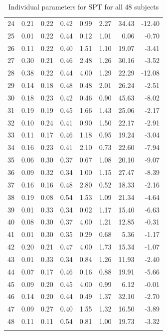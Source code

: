 \documentclass[11pt, a4paper, oneside,final,notitlepage,onecolumn]{article}\usepackage[]{graphicx}\usepackage[]{color}
\begin{document}
\begin{longtable}{rrrrrrrr}
  24 & 0.21 & 0.22 & 0.42 & 0.99 & 2.27 & 34.43 & -12.40 \\ 
  25 & 0.01 & 0.22 & 0.44 & 0.12 & 1.01 & 0.06 & -0.70 \\ 
  26 & 0.11 & 0.22 & 0.40 & 1.51 & 1.10 & 19.07 & -3.41 \\ 
  27 & 0.30 & 0.21 & 0.46 & 2.48 & 1.26 & 30.16 & -3.52 \\ 
  28 & 0.38 & 0.22 & 0.44 & 4.00 & 1.29 & 22.29 & -12.08 \\ 
  29 & 0.14 & 0.18 & 0.48 & 0.48 & 2.01 & 26.24 & -2.51 \\ 
  30 & 0.18 & 0.23 & 0.42 & 0.46 & 0.90 & 45.63 & -8.02 \\ 
  31 & 0.19 & 0.19 & 0.45 & 1.66 & 1.43 & 25.06 & -2.17 \\ 
  32 & 0.10 & 0.24 & 0.41 & 0.90 & 1.50 & 22.17 & -2.91 \\ 
  33 & 0.11 & 0.17 & 0.46 & 1.18 & 0.95 & 19.24 & -3.04 \\ 
  34 & 0.16 & 0.23 & 0.41 & 2.10 & 0.73 & 22.60 & -7.94 \\ 
  35 & 0.06 & 0.30 & 0.37 & 0.67 & 1.08 & 20.10 & -9.07 \\ 
  36 & 0.09 & 0.32 & 0.34 & 1.00 & 1.15 & 27.47 & -8.39 \\ 
  37 & 0.16 & 0.16 & 0.48 & 2.80 & 0.52 & 18.33 & -2.16 \\ 
  38 & 0.19 & 0.08 & 0.54 & 1.53 & 1.09 & 21.34 & -4.64 \\ 
  39 & 0.01 & 0.33 & 0.34 & 0.02 & 1.17 & 15.40 & -6.63 \\ 
  40 & 0.08 & 0.30 & 0.37 & 4.00 & 1.21 & 12.85 & -0.31 \\ 
  41 & 0.01 & 0.30 & 0.35 & 0.29 & 0.68 & 5.36 & -1.17 \\ 
  42 & 0.20 & 0.21 & 0.47 & 4.00 & 1.73 & 15.34 & -1.07 \\ 
  43 & 0.01 & 0.33 & 0.34 & 0.84 & 1.26 & 11.93 & -2.40 \\ 
  44 & 0.07 & 0.17 & 0.46 & 0.16 & 0.88 & 19.91 & -5.66 \\ 
  45 & 0.09 & 0.20 & 0.45 & 4.00 & 0.99 & 6.12 & -0.01 \\ 
  46 & 0.14 & 0.20 & 0.44 & 0.49 & 1.37 & 32.10 & -2.70 \\ 
  47 & 0.09 & 0.27 & 0.40 & 1.55 & 1.32 & 16.50 & -3.89 \\ 
  48 & 0.11 & 0.11 & 0.54 & 0.81 & 1.00 & 19.73 & -3.32 \\ 
   \hline
\hline
\caption{Individual parameters for SPT for all 48 subjects} 
\label{table_A2_median_pars}
\end{longtable}
\end{document}
